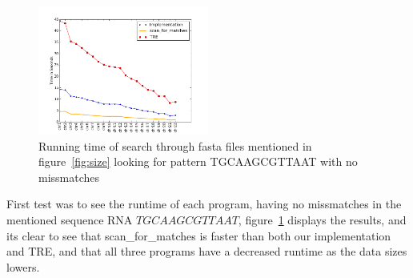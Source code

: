 \begin{figure}[h!]
\centering
\includegraphics[width=0.5\textwidth]{Benchmarking/0miss.png}
\caption{Running time of search through fasta files mentioned in figure~\ref{fig:size} looking for pattern TGCAAGCGTTAAT with no missmatches}
\label{fig:0miss}
\end{figure}

First test was to see the runtime of each program, having no missmatches in the mentioned sequence RNA $TGCAAGCGTTAAT$, figure~\ref{fig:0miss} displays the results, and its clear to see that scan\_for\_matches is faster than both our implementation and TRE, and that all three programs have a decreased runtime as the data sizes lowers.

